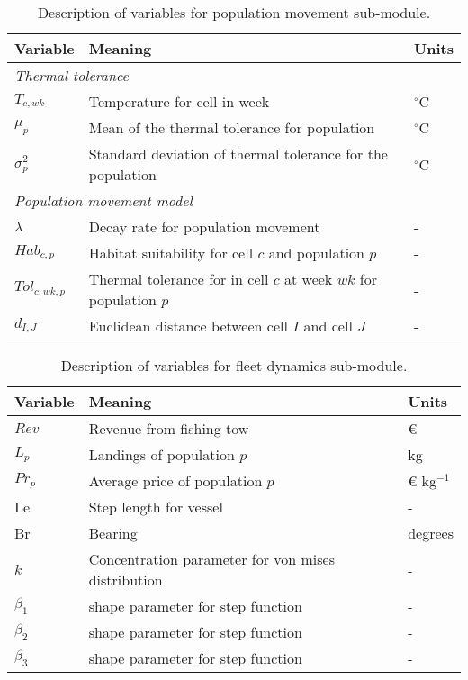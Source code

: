 \begin{table}[!ht]
	\centering
	\caption{Description of variables for population movement sub-module.}
	\begin{tabular}{p{1.5cm} p{8cm} p{1.5cm}}
		\toprule
		Variable & Meaning & Units \\
		\hline
		\multicolumn{3}{l}{\textit{Thermal tolerance}} \\
		\hline
		$T_{c,wk}$ & Temperature for cell in week & $^\circ$C \\
		$\mu_{p}$ & Mean of the thermal tolerance for population & $^\circ$C \\
		$\sigma^{2}_{p}$ & Standard deviation of thermal tolerance for
		the population & $^\circ$C \\
		\hline
		\multicolumn{3}{l}{\textit{Population movement model}} \\
		\hline
		$\lambda$ & Decay rate for population movement & - \\
		$Hab_{c,p}$ & Habitat suitability for cell $c$ and
		population $p$ & - \\
		$Tol_{c,wk,p}$ & Thermal tolerance for in cell $c$ at week $wk$
		for population $p$ & - \\
		$d_{I,J}$ & Euclidean distance between cell $I$ and cell $J$ & - \\
		\bottomrule
		\end{tabular}
	\end{table}

\begin{table}[!ht]
	\centering
	\caption{Description of variables for fleet dynamics sub-module.}
	\begin{tabular}{p{1.5cm} p{8cm} p{1.5cm}}
		\toprule
		Variable & Meaning & Units \\
		\hline
		$Rev$ & Revenue from fishing tow & \euro \\
		$L_{p}$ & Landings of population $p$ & kg \\
		$Pr_{p}$ & Average price of population $p$ & \euro
		\hspace{0.1cm} kg$^{-1}$ \\
		Le & Step length for vessel & - \\
		Br & Bearing & degrees \\
		$k$ & Concentration parameter for von mises distribution & - \\
		$\beta_{1}$ & shape parameter for step function & - \\
		$\beta_{2}$ & shape parameter for step function & - \\
		$\beta_{3}$ & shape parameter for step function & - \\
		\bottomrule
	\end{tabular}
\end{table}


